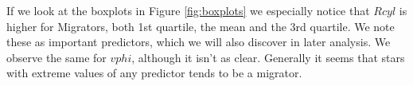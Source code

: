 

If we look at the boxplots in Figure \ref{fig:boxplots} we especially notice that $Rcyl$ is higher for Migrators, both 1st quartile, the mean and the 3rd quartile. We note these as important predictors, which we will also discover in later analysis. We observe the same for $vphi$, although it isn't as clear. Generally it seems that stars with extreme values of any predictor tends to be a migrator.

